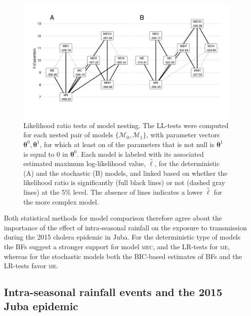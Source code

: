 \begin{figure}
    \centering
    \includegraphics[width = \textwidth, trim = 11mm 19mm 10mm 12mm, clip]{fig_cholera-rainfall/Lemaitre_ACTROP_2018_42_R1_fig3.png}
    \caption[Likelihood ratio tests of model nesting]{Likelihood ratio tests of model nesting. The LL-tests were computed for each nested pair of models $\{\mathcal{M}_0, \mathcal{M}_1\}$, with parameter vectors $\boldsymbol{\theta}^0,\boldsymbol{\theta}^1$, for which at least on of the parameters that is not null is $\boldsymbol{\theta}^1$ is equal to 0 in $\boldsymbol{\theta}^0$. Each model is labeled with its associated estimated maximum log-likelihood value, $\hat{\ell}$, for the deterministic (A) and the stochastic (B) models, and linked based on whether the likelihood ratio is significantly (full black lines) or not (dashed gray lines) at the 5\% level. The absence of lines indicates a lower $\hat{\ell}$ for the more complex model.} 
    \label{fig:lltests}
\end{figure}

Both statistical methods for model comparison therefore agree about the importance of the effect of intra-seasonal rainfall on the exposure to transmission during the 2015 cholera epidemic in Juba. For the deterministic type of models the BFs suggest a stronger support for model \textsc{mec}, and the LR-tests for \textsc{me}, whereas for the stochastic models both the BIC-based estimates of BFs and the LR-tests favor \textsc{me}. 

\subsection{Intra-seasonal rainfall events and the 2015 Juba epidemic}

